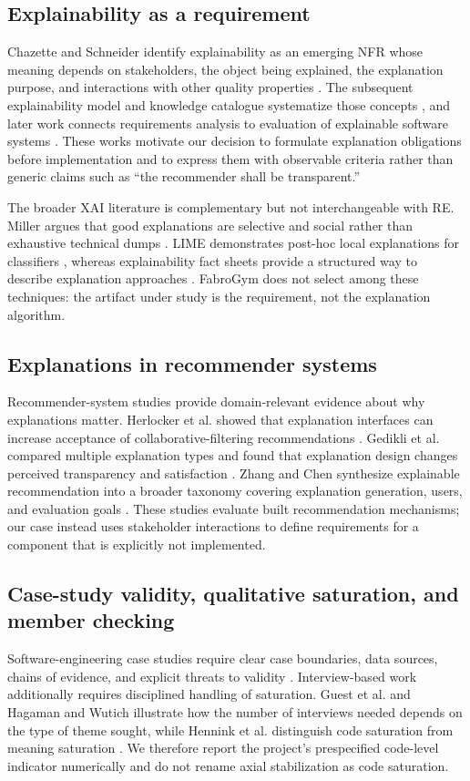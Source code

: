 \documentclass[pdflatex,sn-basic]{sn-jnl}
\begin{document}
\subsection{Explainability as a requirement}
Chazette and Schneider identify explainability as an emerging NFR whose meaning depends on stakeholders, the object being explained, the explanation purpose, and interactions with other quality properties \cite{chazette2020}. The subsequent explainability model and knowledge catalogue systematize those concepts \cite{chazette2021}, and later work connects requirements analysis to evaluation of explainable software systems \cite{chazette2022}. These works motivate our decision to formulate explanation obligations before implementation and to express them with observable criteria rather than generic claims such as ``the recommender shall be transparent.''

The broader XAI literature is complementary but not interchangeable with RE. Miller argues that good explanations are selective and social rather than exhaustive technical dumps \cite{miller2019}. LIME demonstrates post-hoc local explanations for classifiers \cite{ribeiro2016}, whereas explainability fact sheets provide a structured way to describe explanation approaches \cite{sokol2020}. FabroGym does not select among these techniques: the artifact under study is the requirement, not the explanation algorithm.

\subsection{Explanations in recommender systems}
Recommender-system studies provide domain-relevant evidence about why explanations matter. Herlocker et al. showed that explanation interfaces can increase acceptance of collaborative-filtering recommendations \cite{herlocker2000}. Gedikli et al. compared multiple explanation types and found that explanation design changes perceived transparency and satisfaction \cite{gedikli2014}. Zhang and Chen synthesize explainable recommendation into a broader taxonomy covering explanation generation, users, and evaluation goals \cite{zhangchen2020}. These studies evaluate built recommendation mechanisms; our case instead uses stakeholder interactions to define requirements for a component that is explicitly not implemented.

\subsection{Case-study validity, qualitative saturation, and member checking}
Software-engineering case studies require clear case boundaries, data sources, chains of evidence, and explicit threats to validity \cite{runeson2009,siegmund2015}. Interview-based work additionally requires disciplined handling of saturation. Guest et al. and Hagaman and Wutich illustrate how the number of interviews needed depends on the type of theme sought, while Hennink et al. distinguish code saturation from meaning saturation \cite{guest2006,hagaman2017,hennink2017}. We therefore report the project's prespecified code-level indicator numerically and do not rename axial stabilization as code saturation.
\end{document}
